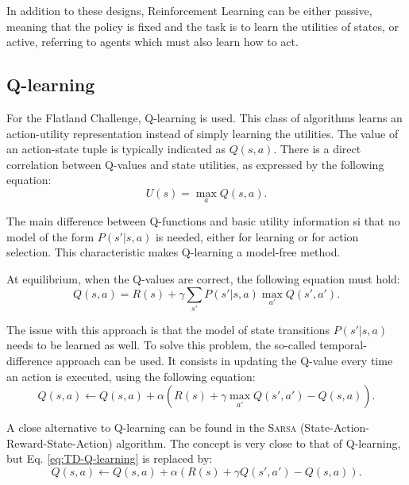 \documentclass[a4paper, 12pt]{article}
\numberwithin{equation}{section}
\begin{document}
In addition to these designs, Reinforcement Learning can be either passive, meaning that the policy is fixed and the task is to learn the utilities of states, or active, referring to agents which must also learn how to act.

\subsection{Q-learning}

For the Flatland Challenge, Q-learning is used. This class of algorithms learns an action-utility representation instead of simply learning the utilities. The value of an action-state tuple is typically indicated as $Q\left(s,a\right)$. There is a direct correlation between Q-values and state utilities, as expressed by the following equation:
\begin{equation}
	U\left(s\right) = \max_a Q\left(s,a\right).
\end{equation}

The main difference between Q-functions and basic utility information si that no model of the form $P\left(s'|s,a\right)$ is needed, either for learning or for action selection. This characteristic makes Q-learning a model-free method.

At equilibrium, when the Q-values are correct, the following equation must hold:
\begin{equation}\label{eq:equilibrium}
	Q\left(s,a\right)=R\left(s\right)+\gamma\sum_{s'}P\left(s'|s,a\right)\max_{a'}Q\left(s',a'\right).
\end{equation}

The issue with this approach is that the model of state transitions $P\left(s'|s,a\right)$ needs to be learned as well. To solve this problem, the so-called temporal-difference approach can be used. It consists in updating the Q-value every time an action is executed, using the following equation:
\begin{equation}\label{eq:TD-Q-learning}
	Q\left(s,a\right) \leftarrow Q\left(s,a\right) + \alpha\left(R\left(s\right)+\gamma\max_{a'}Q\left(s',a'\right)-Q\left(s,a\right)\right).
\end{equation}

A close alternative to Q-learning can be found in the \textsc{Sarsa} (State-Action-Reward-State-Action) algorithm. The concept is very close to that of Q-learning, but Eq. \eqref{eq:TD-Q-learning} is replaced by:
\begin{equation}\label{eq:SARSA}
	Q\left(s,a\right) \leftarrow Q\left(s,a\right) + \alpha\left(R\left(s\right)+\gamma Q\left(s',a'\right)-Q\left(s,a\right)\right).
\end{equation}
\end{document}
